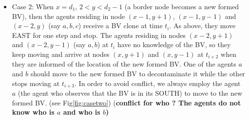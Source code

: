 \begin{itemize}
\item Case 2: When $x=d_1$, $2<y<d_2-1$ (a border node becomes a new formed BV), then the agents residing in node $(x-1, y+1)$, $(x-1, y-1)$ and $(x-2, y)$  (say  $a,b,c$)  receive a BV clone at time $t_i$. As above, they move EAST for one step and stop. The agents residing in nodes $(x-2, y+1)$ and $(x-2, y-1)$ (say  $a,b$) at $t_i$ have no knowledge of the BV, so they keep moving and arrive at nodes $(x, y+1)$ and $(x, y-1)$ at $t_{i+2}$ when they are informed of the location of the new formed BV. One of the agents $a$ and $b$ should move to the new formed BV to decontaminate it while the other stops moving at $t_{i+3}$. In order to avoid conflict, we always employ the agent $a$ (the agent who observes that the BV is in its SOUTH) to move to the new formed BV. (see Fig\ref{fig:casetwo}) {(\bf conflict for who ? The agents do not know who is $a$ and who is $b$)}
\begin{figure} [H]
  \centering 
    \hspace{1in} 

\end{figure}
\end{itemize}
